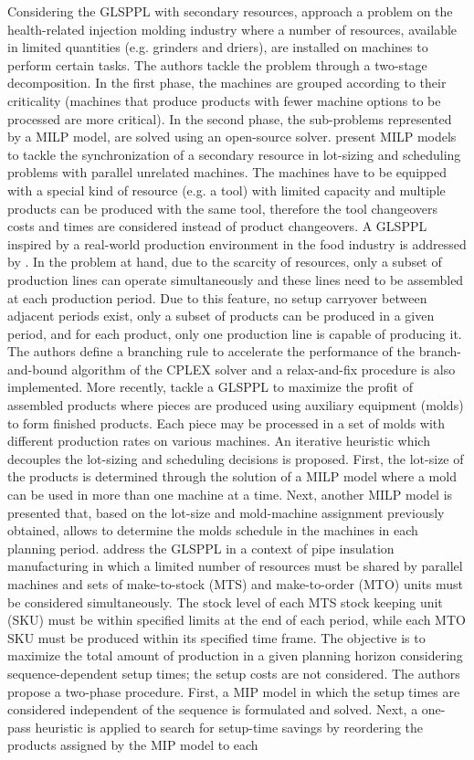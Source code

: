 \documentclass[11pt]{article}
\begin{document}
Considering the GLSPPL with secondary resources, \cite{dastidar2005scheduling} approach a problem on the health-related injection molding industry where a number of resources, available in limited quantities (e.g. grinders and driers), are installed on machines to perform certain tasks. The authors tackle the problem through a two-stage decomposition. In the first phase, the machines are grouped according to their criticality (machines that produce products with fewer machine options to be processed are more critical). In the second phase, the sub-problems represented by a MILP model, are solved using an open-source solver. \cite{alme2011} present MILP models to tackle the synchronization of a secondary resource in lot-sizing and scheduling problems with parallel unrelated machines. The machines have to be equipped with a special kind of resource (e.g. a tool) with limited capacity and multiple products can be produced with the same tool, therefore the tool changeovers costs and times are considered instead of product changeovers. A GLSPPL inspired by a real-world production environment in the food industry is addressed by \cite{soler2020}. In the problem at hand, due to the scarcity of resources, only a subset of production lines can operate simultaneously and these lines need to be assembled at each production period. Due to this feature, no setup carryover between adjacent periods exist, only a subset of products can be produced in a given period, and for each product, only one production line is capable of producing it. The authors define a branching rule to accelerate the performance of the branch-and-bound algorithm of the CPLEX solver and a relax-and-fix procedure is also implemented. More recently, \cite{yasmin2020} tackle a GLSPPL to maximize the profit of assembled products  where pieces are produced using auxiliary equipment (molds) to form finished products. Each piece may be processed in a set of molds with different production rates on various machines. An iterative heuristic which decouples the lot-sizing and scheduling decisions is proposed.  First, the lot-size of the products is determined through the solution of a MILP model where a mold can be used in more than one machine at a time. Next, another MILP model is presented that, based on the lot-size and mold-machine assignment previously obtained, allows to determine the molds schedule in the machines in each planning period. \cite{dearmas2020} address the GLSPPL in a context of pipe insulation manufacturing in which a limited number of resources must be shared by parallel machines and sets of make-to-stock (MTS) and make-to-order (MTO) units must be considered simultaneously. The stock level of each MTS stock keeping unit (SKU) must be within specified limits at the end of each period, while each MTO SKU must be produced within its specified time frame. The objective is to maximize the total amount of production in a given planning horizon considering sequence-dependent setup times; the setup costs are not considered. The authors propose a two-phase procedure. First, a MIP model in which the setup times are considered independent of the sequence is formulated and solved. Next, a one-pass heuristic is applied to search for setup-time savings by reordering the products assigned by the MIP model to each 
\end{document}
